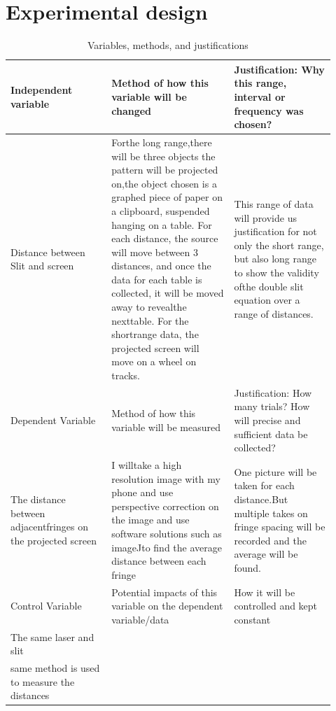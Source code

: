 \documentclass[11pt]{article}
\begin{document}

\section{Experimental design}
\begin{longtable}{p{0.29\linewidth}p{0.34\linewidth}p{0.29\linewidth}}
\caption{Variables, methods, and justifications}\label{tab:variables}\\
\hline
Independent variable & Method of how this variable will be changed & Justification: Why this range, interval or frequency was chosen? \\
\hline
Distance between Slit and screen & Forthe long range,there will be three objects the pattern will be projected on,the object chosen is a graphed piece of paper on a clipboard, suspended hanging on a table. For each distance, the source will move between 3 distances, and once the data for each table is collected, it will be moved away to revealthe nexttable. For the shortrange data, the projected screen will move on a wheel on tracks. & This range of data will provide us justification for not only the short range, but also long range to show the validity ofthe double slit equation over a range of distances. \\
Dependent Variable & Method of how this variable will be measured & Justification: How many trials? How will precise and sufficient data be collected? \\
The distance between adjacentfringes on the projected screen & I willtake a high resolution image with my phone and use perspective correction on the image and use software solutions such as imageJto find the average distance between each fringe & One picture will be taken for each distance.But multiple takes on fringe spacing will be recorded and the average will be found. \\
Control Variable & Potential impacts of this variable on the dependent variable/data & How it will be controlled and kept constant \\
The same laser and slit &  &  \\
same method is used to measure the distances &  &  \\
\hline
\end{longtable}
\end{document}
